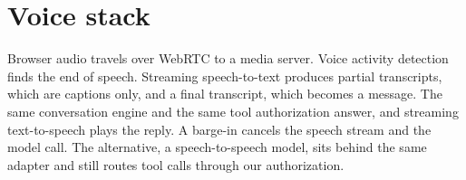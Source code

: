 

\section{Voice stack}

Browser audio travels over WebRTC to a media server. Voice activity detection finds the end of speech. Streaming speech-to-text produces partial transcripts, which are captions only, and a final transcript, which becomes a message. The same conversation engine and the same tool authorization answer, and streaming text-to-speech plays the reply. A barge-in cancels the speech stream and the model call. The alternative, a speech-to-speech model, sits behind the same adapter and still routes tool calls through our authorization.



